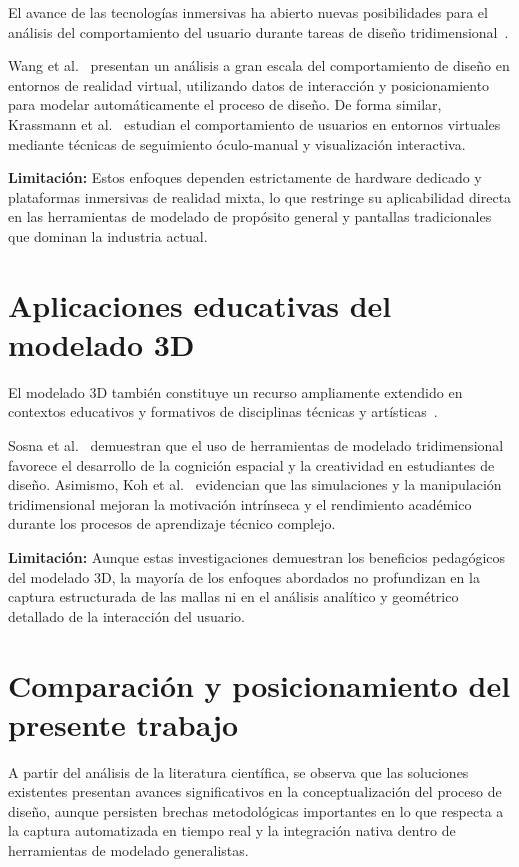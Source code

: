 El avance de las tecnologías inmersivas ha abierto nuevas posibilidades para el análisis del comportamiento del usuario durante tareas de diseño tridimensional~\cite{krassmann2018,wang2024}.

Wang et al.~\cite{wang2024} presentan un análisis a gran escala del comportamiento de diseño en entornos de realidad virtual, utilizando datos de interacción y posicionamiento para modelar automáticamente el proceso de diseño. De forma similar, Krassmann et al.~\cite{krassmann2018} estudian el comportamiento de usuarios en entornos virtuales mediante técnicas de seguimiento óculo-manual y visualización interactiva.

\textbf{Limitación:} Estos enfoques dependen estrictamente de hardware dedicado y plataformas inmersivas de realidad mixta, lo que restringe su aplicabilidad directa en las herramientas de modelado de propósito general y pantallas tradicionales que dominan la industria actual.

\section{Aplicaciones educativas del modelado 3D}

El modelado 3D también constituye un recurso ampliamente extendido en contextos educativos y formativos de disciplinas técnicas y artísticas~\cite{koh2010,sosna2025}.

Sosna et al.~\cite{sosna2025} demuestran que el uso de herramientas de modelado tridimensional favorece el desarrollo de la cognición espacial y la creatividad en estudiantes de diseño. Asimismo, Koh et al.~\cite{koh2010} evidencian que las simulaciones y la manipulación tridimensional mejoran la motivación intrínseca y el rendimiento académico durante los procesos de aprendizaje técnico complejo.

\textbf{Limitación:} Aunque estas investigaciones demuestran los beneficios pedagógicos del modelado 3D, la mayoría de los enfoques abordados no profundizan en la captura estructurada de las mallas ni en el análisis analítico y geométrico detallado de la interacción del usuario.

\section{Comparación y posicionamiento del presente trabajo}

A partir del análisis de la literatura científica, se observa que las soluciones existentes presentan avances significativos en la conceptualización del proceso de diseño, aunque persisten brechas metodológicas importantes en lo que respecta a la captura automatizada en tiempo real y la integración nativa dentro de herramientas de modelado generalistas.

